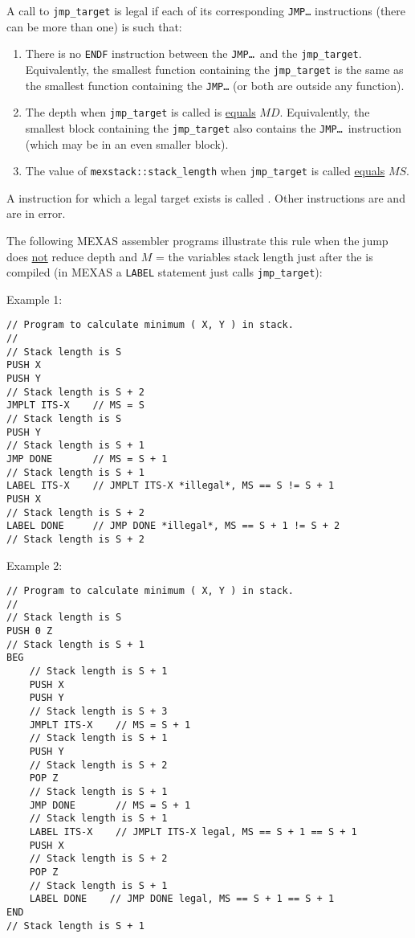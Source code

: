 \documentclass[12pt]{article}
\begin{document}
A call to {\tt jmp\_target} is legal if each of its
corresponding {\tt JMP\ldots} instructions (there can be more than one)
is such that:
\begin{enumerate}
\item
There is no {\tt ENDF} instruction between the
{\tt JMP\ldots}~and the {\tt jmp\_target}.
Equivalently, the smallest function containing the {\tt jmp\_target}
is the same as the smallest function containing the {\tt JMP\ldots}
(or both are outside any function).
\item The depth when {\tt jmp\_target} is called is \underline{equals} $MD$.
Equivalently, the smallest block containing the {\tt jmp\_target}
also contains the {\tt JMP\ldots}~instruction (which may be in an even
smaller block).
\item The value of {\tt mexstack::stack\_length} when {\tt jmp\_target}
is called \underline{equals} $MS$.
\end{enumerate}

A  instruction for which a legal target exists
is called .  Other  instructions
are  and are in error.

The following MEXAS assembler programs illustrate this
rule when the jump does \underline{not}
reduce depth and $M$ = the variables stack length just after the
 is compiled (in MEXAS a {\tt LABEL} statement
just calls {\tt jmp\_target}):

Example 1:
\begin{indpar}\begin{verbatim}
// Program to calculate minimum ( X, Y ) in stack.
//
// Stack length is S
PUSH X
PUSH Y
// Stack length is S + 2
JMPLT ITS-X    // MS = S
// Stack length is S
PUSH Y
// Stack length is S + 1
JMP DONE       // MS = S + 1
// Stack length is S + 1
LABEL ITS-X    // JMPLT ITS-X *illegal*, MS == S != S + 1
PUSH X
// Stack length is S + 2
LABEL DONE     // JMP DONE *illegal*, MS == S + 1 != S + 2
// Stack length is S + 2
\end{verbatim}\end{indpar}

Example 2:
\begin{indpar}\begin{verbatim}
// Program to calculate minimum ( X, Y ) in stack.
//
// Stack length is S
PUSH 0 Z
// Stack length is S + 1
BEG
    // Stack length is S + 1
    PUSH X
    PUSH Y
    // Stack length is S + 3
    JMPLT ITS-X    // MS = S + 1
    // Stack length is S + 1
    PUSH Y
    // Stack length is S + 2
    POP Z
    // Stack length is S + 1
    JMP DONE       // MS = S + 1
    // Stack length is S + 1
    LABEL ITS-X    // JMPLT ITS-X legal, MS == S + 1 == S + 1
    PUSH X
    // Stack length is S + 2
    POP Z
    // Stack length is S + 1
    LABEL DONE    // JMP DONE legal, MS == S + 1 == S + 1
END
// Stack length is S + 1
\end{verbatim}\end{indpar}
\end{document}

